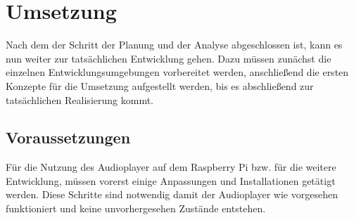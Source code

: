 
\chapter{Umsetzung}

Nach dem der Schritt der Planung und der Analyse abgeschlossen ist, kann es nun
weiter zur tatsächlichen Entwicklung gehen. Dazu müssen zunächst die einzelnen
Entwicklungsumgebungen vorbereitet werden, anschließend die ersten Konzepte für
die Umsetzung aufgestellt werden, bis es abschließend zur tatsächlichen
Realisierung kommt. 


\section{Voraussetzungen}
Für die Nutzung des Audioplayer auf dem Raspberry Pi bzw. für die weitere
Entwicklung, müssen vorerst einige Anpassungen und Installationen getätigt
werden. Diese Schritte sind notwendig damit der Audioplayer wie vorgesehen
funktioniert und keine unvorhergesehen Zustände entstehen.


